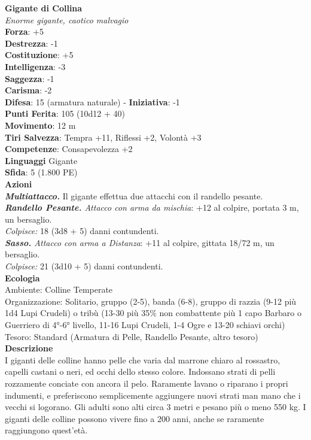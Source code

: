 \begin{multicols}{2}
\medskip\textbf{Gigante di Collina}\\
\emph{Enorme gigante, caotico malvagio}\\
\textbf{Forza}: +5\\
\textbf{Destrezza}: -1\\
\textbf{Costituzione}: +5\\
\textbf{Intelligenza}: -3\\
\textbf{Saggezza}: -1\\
\textbf{Carisma}: -2\\
\textbf{Difesa}: 15 (armatura naturale) - \textbf{Iniziativa}: -1\\
\textbf{Punti Ferita}: 105 (10d12 + 40)\\
\textbf{Movimento}: 12 m\\
\textbf{Tiri Salvezza}: Tempra +11, Riflessi +2, Volontà +3\\
\textbf{Competenze}: Consapevolezza +2\\
\textbf{Linguaggi} Gigante\\
\textbf{Sfida}: 5 (1.800 PE)\smallskip\\
\smallskip\textbf{Azioni}\\
\emph{\textbf{Multiattacco.}} Il gigante effettua due attacchi con il randello pesante.\\
\emph{\textbf{Randello Pesante.} Attacco con arma da mischia}: +12 al colpire, portata 3 m, un bersaglio.\\
\emph{Colpisce:} 18 (3d8 + 5) danni contundenti.\\
\emph{\textbf{Sasso.} Attacco con arma a Distanza}: +11 al colpire, gittata 18/72 m, un bersaglio.\\
\emph{Colpisce:} 21 (3d10 + 5) danni contundenti.\\
\textbf{Ecologia}\\
Ambiente: Colline Temperate\\
Organizzazione: Solitario, gruppo (2-5), banda (6-8), gruppo di razzia (9-12 più 1d4 Lupi Crudeli) o tribù (13-30 più 35\% non combattente più 1 capo Barbaro o Guerriero di 4°-6° livello, 11-16 Lupi Crudeli, 1-4 Ogre e 13-20 schiavi orchi)\\
Tesoro: Standard (Armatura di Pelle, Randello Pesante, altro tesoro)\\
\textbf{Descrizione}\\
I giganti delle colline hanno pelle che varia dal marrone chiaro al rossastro, capelli castani o neri, ed occhi dello stesso colore. Indossano strati di pelli rozzamente conciate con ancora il pelo. Raramente lavano o riparano i propri indumenti, e preferiscono semplicemente aggiungere nuovi strati man mano che i vecchi si logorano. Gli adulti sono alti circa 3 metri e pesano più o meno 550 kg. I giganti delle colline possono vivere fino a 200 anni, anche se raramente raggiungono quest’età.\\

\end{multicols}
